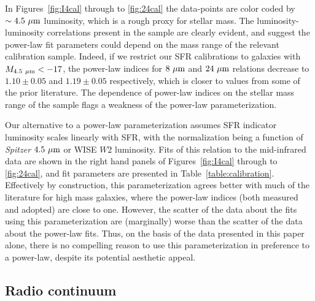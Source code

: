 \documentclass[preprint]{aastex61}
\begin{document}

In Figures~\ref{fig:I4cal} through to \ref{fig:24cal} the data-points are color coded by $\sim 4.5~{\rm \mu m}$ luminosity, which is a rough proxy for stellar mass. The luminosity-luminosity correlations present in the sample are clearly evident, and suggest the power-law fit parameters could depend on the mass range of the relevant calibration sample. Indeed, if we restrict our SFR calibrations to galaxies with $M_{\rm 4.5~\mu m}<-17$, the power-law indices for $8~{\rm \mu m}$ and $24~{\rm \mu m}$ relations decrease to $1.10 \pm 0.05$ and $1.19 \pm 0.05$ respectively, which is closer to values from some of the prior literature. The dependence of power-law indices on the stellar mass range of the sample flags a weakness of the power-law parameterization.

Our alternative to a power-law parameterization assumes SFR indicator luminosity scales linearly with SFR, with the normalization being a function of {\it Spitzer} $4.5~{\rm \mu m}$ or WISE $W2$ luminosity. Fits of this relation to the mid-infrared data are shown in the right hand panels of Figures~\ref{fig:I4cal} through to \ref{fig:24cal}, and fit parameters are presented in Table~\ref{table:calibration}. Effectively by construction, this parameterization agrees better with much of the literature for high mass galaxies, where the power-law indices (both measured and adopted) are close to one. However, the scatter of the data about the fits using this parameterization are (marginally) worse than the scatter of the data about the power-law fits. Thus, on the basis of the data presented in this paper alone, there is no compelling reason to use this parameterization in preference to a power-law, despite its potential aesthetic appeal.  

\subsection{Radio continuum}
\end{document}
